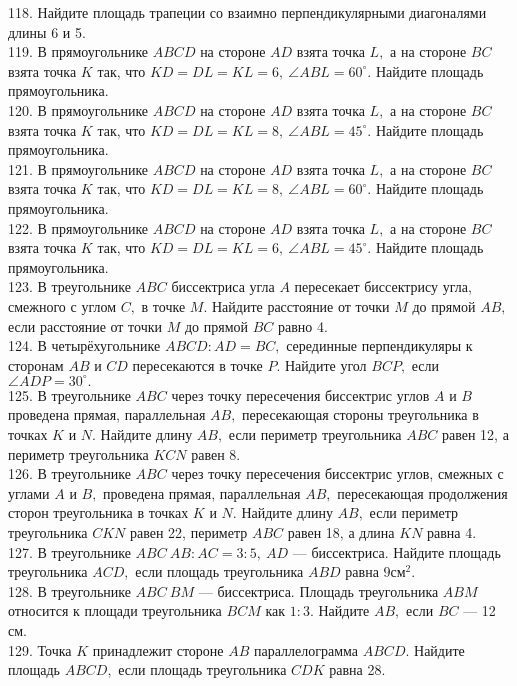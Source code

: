 118. Найдите площадь трапеции со взаимно перпендикулярными диагоналями длины 6 и 5.\\
119. В прямоугольнике $ABCD$ на стороне $AD$ взята точка $L,$ а на стороне $BC$ взята точка $K$ так, что $KD=DL=KL=6,\ \angle ABL=60^\circ.$ Найдите площадь прямоугольника.\\
120. В прямоугольнике $ABCD$ на стороне $AD$ взята точка $L,$ а на стороне $BC$ взята точка $K$ так, что $KD=DL=KL=8,\ \angle ABL=45^\circ.$ Найдите площадь прямоугольника.\\
121. В прямоугольнике $ABCD$ на стороне $AD$ взята точка $L,$ а на стороне $BC$ взята точка $K$ так, что $KD=DL=KL=8,\ \angle ABL=60^\circ.$ Найдите площадь прямоугольника.\\
122. В прямоугольнике $ABCD$ на стороне $AD$ взята точка $L,$ а на стороне $BC$ взята точка $K$ так, что $KD=DL=KL=6,\ \angle ABL=45^\circ.$ Найдите площадь прямоугольника.\\
123. В треугольнике $ABC$ биссектриса угла $A$ пересекает биссектрису угла, смежного с углом $C,$ в точке $M.$ Найдите расстояние от точки $M$ до прямой $AB,$ если расстояние от точки $M$ до прямой $BC$ равно 4.\\
124. В четырёхугольнике $ABCD: AD=BC,$ серединные перпендикуляры к сторонам $AB$ и $CD$ пересекаются в точке $P.$ Найдите угол $BCP,$ если $\angle ADP=30^\circ.$\\
125. В треугольнике $ABC$ через точку пересечения биссектрис углов $A$ и $B$ проведена прямая, параллельная $AB,$ пересекающая стороны треугольника в точках $K$ и $N.$ Найдите длину $AB,$ если периметр треугольника $ABC$ равен 12, а периметр треугольника $KCN$ равен 8.\\
126. В треугольнике $ABC$ через точку пересечения биссектрис углов, смежных с углами $A$ и $B,$ проведена прямая, параллельная $AB,$ пересекающая продолжения сторон треугольника в точках $K$ и $N.$ Найдите длину $AB,$ если периметр треугольника $CKN$ равен 22, периметр $ABC$ равен 18, а длина $KN$ равна 4.\\
127. В треугольнике $ABC\ AB:AC=3:5,\ AD$ --- биссектриса. Найдите площадь треугольника $ACD,$ если площадь треугольника $ABD$ равна $9\text{см}^2.$\\  128. В треугольнике $ABC\ BM$ --- биссектриса. Площадь треугольника $ABM$ относится к площади треугольника $BCM$ как $1:3.$ Найдите $AB,$ если $BC$ --- 12 см.\\
129. Точка $K$ принадлежит стороне $AB$ параллелограмма $ABCD.$ Найдите площадь $ABCD,$ если площадь треугольника $CDK$ равна 28.\\
